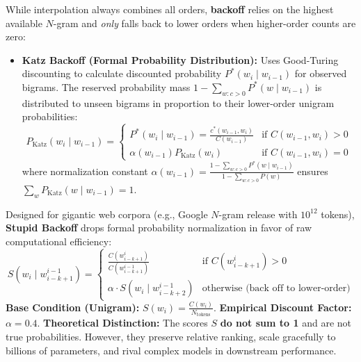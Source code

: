 \documentclass[10pt,a4paper]{article}
\begin{document}
\par\vspace{1pt}
While interpolation always combines all orders, \textbf{backoff} relies on the highest available $N$-gram and \textit{only} falls back to lower orders when higher-order counts are zero:
\begin{itemize}[leftmargin=12pt, itemsep=0.5pt, parsep=0pt, topsep=0.5pt]
    \item \textbf{Katz Backoff (Formal Probability Distribution):}
    Uses Good-Turing discounting to calculate discounted probability $P^*(w_i \mid w_{i-1})$ for observed bigrams. The reserved probability mass $1 - \sum_{w: c>0} P^*(w \mid w_{i-1})$ is distributed to unseen bigrams in proportion to their lower-order unigram probabilities:
    \[
    P_{\text{Katz}}(w_i \mid w_{i-1}) = \begin{cases}
    P^*(w_i \mid w_{i-1}) = \frac{c^*(w_{i-1}, w_i)}{C(w_{i-1})} & \text{if } C(w_{i-1}, w_i) > 0 \\
    \alpha(w_{i-1}) P_{\text{Katz}}(w_i) & \text{if } C(w_{i-1}, w_i) = 0
    \end{cases}
    \]
    where normalization constant $\alpha(w_{i-1}) = \frac{1 - \sum_{w: c>0} P^*(w \mid w_{i-1})}{1 - \sum_{w: c>0} P(w)}$ ensures $\sum_w P_{\text{Katz}}(w \mid w_{i-1}) = 1$.
\end{itemize}

\vspace{-2pt}

\begin{theoremprompt}[title={\bfseries\sffamily Stupid Backoff: Web-Scale Language Modeling (Brants et al., 2007 \& Lab 3)}]
\footnotesize
Designed for gigantic web corpora (e.g., Google $N$-gram release with $10^{12}$ tokens), \textbf{Stupid Backoff} drops formal probability normalization in favor of raw computational efficiency:
\[
S(w_i \mid w_{i-k+1}^{i-1}) = \begin{cases}
\frac{C(w_{i-k+1}^i)}{C(w_{i-k+1}^{i-1})} & \text{if } C(w_{i-k+1}^i) > 0 \\
\alpha \cdot S(w_i \mid w_{i-k+2}^{i-1}) & \text{otherwise (back off to lower-order)}
\end{cases}
\]
\textbf{Base Condition (Unigram):} $S(w_i) = \frac{C(w_i)}{N_{\text{tokens}}}$. \qquad \textbf{Empirical Discount Factor:} $\alpha = 0.4$.
\newline \textbf{Theoretical Distinction:} The scores $S$ \textbf{do not sum to 1} and are not true probabilities. However, they preserve relative ranking, scale gracefully to billions of parameters, and rival complex models in downstream performance.
\end{theoremprompt}
\end{document}
